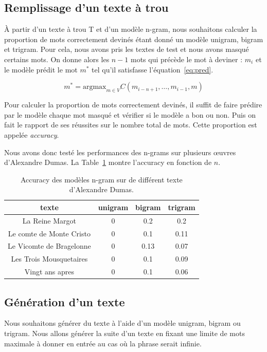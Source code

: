 \documentclass[a4paper]{article}
\begin{document}
\subsection{Remplissage d'un texte à trou}
À partir d'un texte à trou T et d'un modèle n-gram, nous souhaitons calculer la proportion de mots correctement devinés étant donné 
un modèle unigram, bigram et trigram. 
Pour cela, nous avons pris les textes de test et nous avons masqué certains mots. On donne alors les $n-1$ mots qui précède le 
mot à deviner : $m_i$ et le modèle prédit le mot $m^*$ tel qu'il satisfasse l'équation~\ref{eq:pred}.

\begin{equation}
    m^* = \text{argmax} _{m \in V} C(m_{i-n+1},\dots,m_{i-1},m)
    \label{eq:pred}
\end{equation}

Pour calculer la proportion de mots correctement devinés, il suffit de faire prédire par le modèle chaque mot masqué et vérifier 
si le modèle a bon ou non. Puis on fait le rapport de ses réussites sur le nombre total de mots.
Cette proportion est appelée \textit{accuracy}.  

Nous avons donc testé les performances des n-grams sur plusieurs \oe uvres d'Alexandre Dumas. La Table~\ref{tab:acc} montre l'accuracy
en fonction de $n$.

\begin{table}[ht]
    \centering
    \begin{tabular}{|c|c|c|c|}
        \hline
        \textbf{texte} & \textbf{unigram} & \textbf{bigram} & \textbf{trigram} \\
        \hline
        La Reine Margot & 0 & 0.2 & 0.2 \\
        \hline
        Le comte de Monte Cristo & 0 & 0.1 & 0.11 \\
        \hline
        Le Vicomte de Bragelonne & 0 & 0.13 & 0.07 \\
        \hline
        Les Trois Mousquetaires & 0 & 0.1 & 0.09 \\
        \hline
        Vingt ans apres & 0 & 0.1 & 0.06 \\
        \hline
    \end{tabular}
    \caption{Accuracy des modèles n-gram sur de différent texte d'Alexandre Dumas.}
    \label{tab:acc}
\end{table}


\subsection{Génération d'un texte}
Nous souhaitons générer du texte à l'aide d'un modèle unigram, bigram ou trigram. Nous allons générer la suite d'un texte en fixant 
une limite de mots maximale à donner en entrée au cas où la phrase serait infinie.
\end{document}

